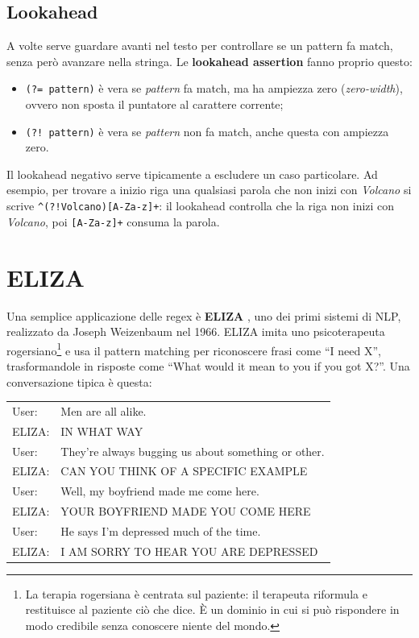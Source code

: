 \subsection{Lookahead}
A volte serve guardare avanti nel testo per controllare se un pattern fa match, senza però avanzare nella stringa. Le \textbf{lookahead assertion} fanno proprio questo:
\begin{itemize}
    \item \verb|(?= pattern)| è vera se \textit{pattern} fa match, ma ha ampiezza zero (\textit{zero-width}), ovvero non sposta il puntatore al carattere corrente;
    \item \verb|(?! pattern)| è vera se \textit{pattern} non fa match, anche questa con ampiezza zero.
\end{itemize}
Il lookahead negativo serve tipicamente a escludere un caso particolare. Ad esempio, per trovare a inizio riga una qualsiasi parola che non inizi con \textit{Volcano} si scrive \verb|^(?!Volcano)[A-Za-z]+|: il lookahead controlla che la riga non inizi con \textit{Volcano}, poi \verb|[A-Za-z]+| consuma la parola.

\section{ELIZA}\label{sec:eliza}
Una semplice applicazione delle regex è \textbf{ELIZA} \cite{weizenbaum1966eliza}, uno dei primi sistemi di NLP, realizzato da Joseph Weizenbaum nel 1966. ELIZA imita uno psicoterapeuta rogersiano\footnote{La terapia rogersiana è centrata sul paziente: il terapeuta riformula e restituisce al paziente ciò che dice. È un dominio in cui si può rispondere in modo credibile senza conoscere niente del mondo.} e usa il pattern matching per riconoscere frasi come \enquote{I need X}, trasformandole in risposte come \enquote{What would it mean to you if you got X?}. Una conversazione tipica è questa:

\begin{center}
\begin{tabular}{ll}
User: & Men are all alike. \\
ELIZA: & IN WHAT WAY \\
User: & They're always bugging us about something or other. \\
ELIZA: & CAN YOU THINK OF A SPECIFIC EXAMPLE \\
User: & Well, my boyfriend made me come here. \\
ELIZA: & YOUR BOYFRIEND MADE YOU COME HERE \\
User: & He says I'm depressed much of the time. \\
ELIZA: & I AM SORRY TO HEAR YOU ARE DEPRESSED \\
\end{tabular}
\end{center}

